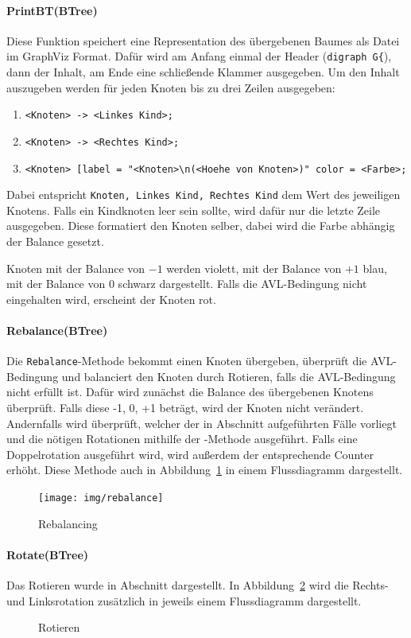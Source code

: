 \paragraph{PrintBT(BTree)}
Diese Funktion speichert eine Representation des übergebenen Baumes als Datei im GraphViz Format.
Dafür wird am Anfang einmal der Header (\verb|digraph G{|), dann der Inhalt, am Ende eine
schließende Klammer ausgegeben.
Um den Inhalt auszugeben werden für jeden Knoten bis zu drei Zeilen ausgegeben:
\begin{enumerate}
    \item \verb|<Knoten> -> <Linkes Kind>;|
    \item \verb|<Knoten> -> <Rechtes Kind>;|
    \item \verb|<Knoten> [label = "<Knoten>\n(<Hoehe von Knoten>)" color = <Farbe>;|
\end{enumerate}
Dabei entspricht \verb|Knoten, Linkes Kind, Rechtes Kind| dem Wert des jeweiligen Knotens.
Falls ein Kindknoten leer sein sollte, wird dafür nur die letzte Zeile ausgegeben.
Diese formatiert den Knoten selber, dabei wird die Farbe abhängig der Balance gesetzt.

Knoten mit der Balance von \(-1\) werden violett, mit der Balance von \(+1\)
blau, mit der Balance von \(0\) schwarz dargestellt.
Falls die AVL-Bedingung nicht eingehalten wird, erscheint der Knoten rot.

\paragraph{Rebalance(BTree)}\label{par:MethodRebalance}
Die \verb|Rebalance|-Methode bekommt einen Knoten übergeben, überprüft die AVL-Bedingung und
balanciert den Knoten durch Rotieren, falls die AVL-Bedingung nicht erfüllt ist.
Dafür wird zunächst die Balance des übergebenen Knotens überprüft.
Falls diese -1, 0, +1 beträgt, wird der Knoten nicht verändert.
Andernfalls wird überprüft, welcher der in Abschnitt  aufgeführten Fälle
vorliegt und die nötigen Rotationen mithilfe der -Methode ausgeführt.
Falls eine Doppelrotation ausgeführt wird, wird außerdem der entsprechende Counter erhöht.
Diese Methode auch in Abbildung~\ref{fig:rebalance} in einem Flussdiagramm dargestellt.
\begin{figure}[hbt]
    \centering
    \texttt{[image: img/rebalance]}
    \caption{Rebalancing}
    \label{fig:rebalance}
\end{figure}


\paragraph{Rotate(BTree)}\label{par:MethodRotate}
Das Rotieren wurde in Abschnitt  dargestellt.
In Abbildung~\ref{fig:rotate} wird die Rechts- und Linksrotation zusätzlich in jeweils einem
Flussdiagramm dargestellt.
\begin{figure}[hbt!]
    \centering
    \caption{Rotieren}
    \label{fig:rotate}
\end{figure}

